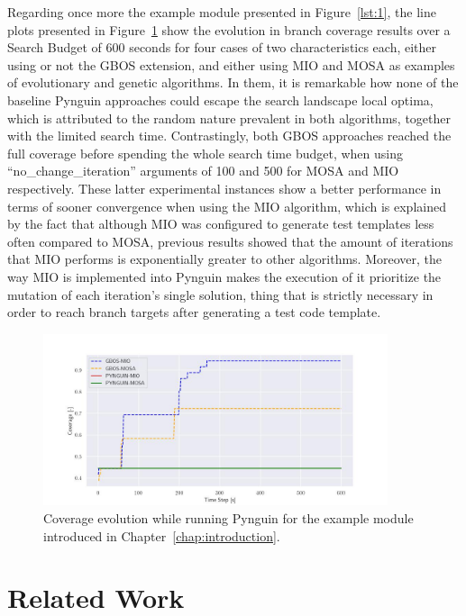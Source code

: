 \documentclass[%
  chapterprefix=false,%
  open=right,%
  twoside=true,%
  paper=a4,%
  logofile={Figures/logo.png},%
  thesistype=master,%
  UKenglish,%
]{se2thesis}
\begin{document}
Regarding once more the example module presented in Figure~\ref{lst:1}, the line plots presented in Figure~\ref{fig:example_cov} show the evolution in branch coverage results over a Search Budget of 600 seconds for four cases of two characteristics each, either using or not the GBOS extension, and either using MIO and MOSA as examples of evolutionary and genetic algorithms.
In them, it is remarkable how none of the baseline Pynguin approaches could escape the search landscape local optima, which is attributed to the random nature prevalent in both algorithms, together with the limited search time.
Contrastingly, both GBOS approaches reached the full coverage before spending the whole search time budget, when using ``no\_change\_iteration'' arguments of 100 and 500 for MOSA and MIO respectively.
These latter experimental instances show a better performance in terms of sooner convergence when using the MIO algorithm, which is explained by the fact that although MIO was configured to generate test templates less often compared to MOSA, previous results showed that the amount of iterations that MIO performs is exponentially greater to other algorithms.
Moreover, the way MIO is implemented into Pynguin makes the execution of it prioritize the mutation of each iteration's single solution, thing that is strictly necessary in order to reach branch targets after generating a test code template. 

\begin{figure}[htb]
  \centering
  \includegraphics[width=0.9\textwidth]{Figures/Results/exampleCov.jpg}
  \caption{Coverage evolution while running Pynguin for the example module introduced in Chapter~\ref{chap:introduction}.}\label{fig:example_cov}
\end{figure}

\chapter{Related Work}\label{chap:related_work}
\end{document}
